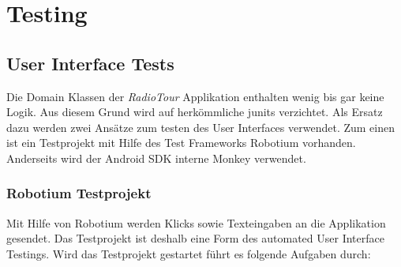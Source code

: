 \chapter{Testing}

\section{User Interface Tests}
Die Domain Klassen der \textit{RadioTour} Applikation enthalten wenig bis gar keine Logik. Aus diesem Grund wird auf herkömmliche \glspl{junit} verzichtet. Als Ersatz dazu werden zwei Ansätze zum testen des User Interfaces verwendet. Zum einen ist ein Testprojekt mit Hilfe des Test Frameworks Robotium vorhanden. Anderseits wird der Android SDK interne Monkey verwendet.
\subsection{Robotium Testprojekt}
 Mit Hilfe von Robotium werden Klicks sowie Texteingaben an die Applikation gesendet. Das Testprojekt ist deshalb eine Form des automated User Interface Testings. Wird das Testprojekt gestartet führt es folgende Aufgaben durch:
